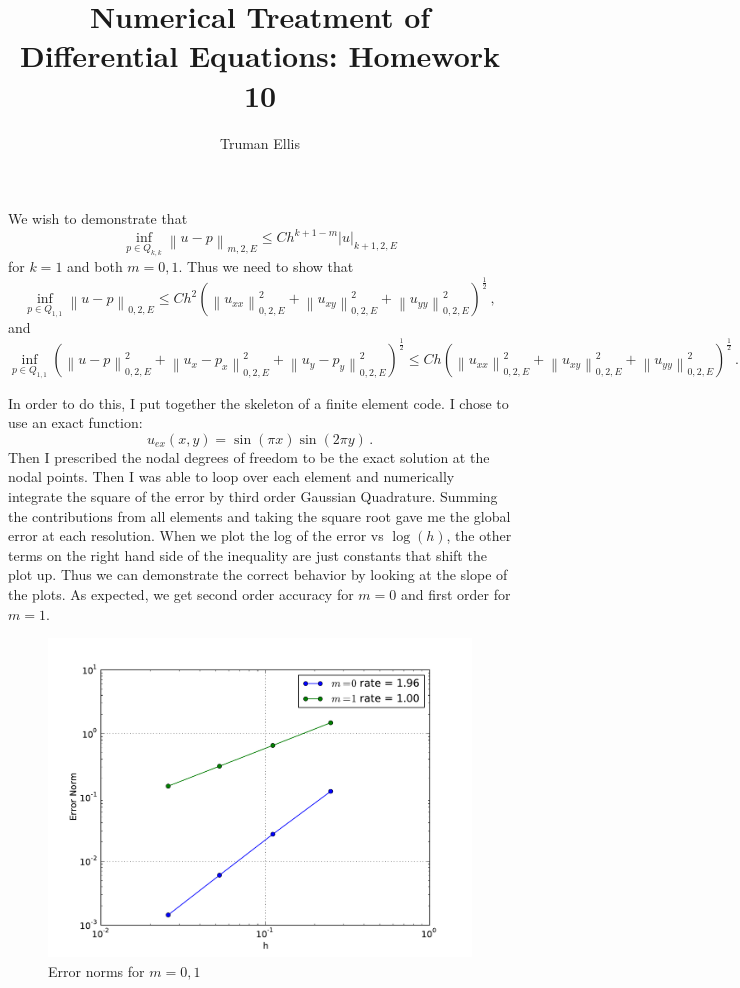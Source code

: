 \documentclass[10pt,letterpaper]{article}
\title{Numerical Treatment of Differential Equations: Homework 10}
\author{Truman Ellis}
\providecommand{\abs}[1]{\left\lvert#1\right\rvert}
\providecommand{\norm}[1]{\left\lVert#1\right\rVert}
\begin{document}
\maketitle

We wish to demonstrate that 
\[
\inf_{p\in Q_{k,k}}\norm{u-p}_{m,2,E}\le Ch^{k+1-m}\abs{u}_{k+1,2,E}
\]
for $k=1$ and both $m=0,1$. Thus we need to show that
\[
\inf_{p\in Q_{1,1}}\norm{u-p}_{0,2,E}\le Ch^2\left(\norm{u_{xx}}_{0,2,E}^2
+\norm{u_{xy}}_{0,2,E}^2+\norm{u_{yy}}_{0,2,E}^2\right)^{\frac{1}{2}}\,,
\]
and
\[
\inf_{p\in Q_{1,1}}\left(
\norm{u-p}_{0,2,E}^2
+\norm{u_x-p_x}_{0,2,E}^2
+\norm{u_y-p_y}_{0,2,E}^2\right)^{\frac{1}{2}}
\le Ch\left(\norm{u_{xx}}_{0,2,E}^2
+\norm{u_{xy}}_{0,2,E}^2+\norm{u_{yy}}_{0,2,E}^2\right)^{\frac{1}{2}}\,.
\]

In order to do this, I put together the skeleton of a finite element code. I
chose to use an exact function:
\[
u_{ex}(x,y)=\sin(\pi x)\sin(2\pi y)\,.
\]
Then I prescribed the nodal degrees of freedom to be the exact solution at the
nodal points. Then I
was able to loop over each element and numerically integrate the square of the
error by third order Gaussian Quadrature. Summing the contributions from all
elements and taking the square root gave me the global error at each resolution.
When we plot the log of the error vs $\log(h)$, the other terms on the right
hand side of the inequality are just constants that shift the plot up. Thus we
can demonstrate the correct behavior by looking at the slope of the plots.
As expected, we get second order accuracy for $m=0$ and first order for $m=1$.

\begin{figure}[h]
\begin{center}
\includegraphics[width=5in]{error.pdf}
\end{center}
\caption{Error norms for $m=0,1$}
\label{fig:error}
\end{figure}

\clearpage
\newpage

\end{document}
